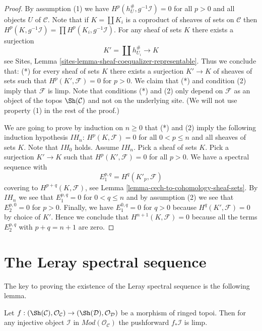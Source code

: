 \begin{proof}
By assumption (1) we have $H^p(h_U^\#, g^{-1}\mathcal{I}) = 0$ for all
$p > 0$ and all objects $U$ of $\mathcal{C}$. Note that if
$K = \coprod K_i$ is a coproduct of sheaves of sets on $\mathcal{C}$
then $H^p(K, g^{-1}\mathcal{I}) = \prod H^p(K_i, g^{-1}\mathcal{I})$.
For any sheaf of sets $K$ there exists a surjection
$$
K' = \coprod h_{U_i}^\# \longrightarrow K
$$
see Sites, Lemma \ref{sites-lemma-sheaf-coequalizer-representable}.
Thus we conclude that: (*) for every sheaf of sets $K$ there exists a
surjection $K' \to K$ of sheaves of sets such that $H^p(K', \mathcal{F}) = 0$
for $p > 0$. We claim that (*) and condition (2) imply that $\mathcal{F}$
is limp. Note that conditions (*) and (2) only depend on $\mathcal{F}$ as an
object of the topos $\Sh(\mathcal{C})$ and not on the underlying site.
(We will not use property (1) in the rest of the proof.)

\medskip\noindent
We are going to prove by induction on $n \geq 0$ that (*) and (2)
imply the following induction hypothesis $IH_n$:
$H^p(K, \mathcal{F}) = 0$ for all $0 < p \leq n$ and
all sheaves of sets $K$. Note that $IH_0$ holds. Assume $IH_n$. Pick
a sheaf of sets $K$. Pick a surjection $K' \to K$ such that
$H^p(K', \mathcal{F}) = 0$ for all $p > 0$. We have a
spectral sequence with
$$
E_1^{p, q} = H^q(K'_p, \mathcal{F})
$$
covering to $H^{p + q}(K, \mathcal{F})$, see
Lemma \ref{lemma-cech-to-cohomology-sheaf-sets}.
By $IH_n$ we see that $E_1^{p, q} = 0$ for $0 < q \leq n$ and by
assumption (2) we see that $E_2^{p, 0} = 0$ for $p > 0$. Finally, we have
$E_1^{0, q} = 0$ for $q > 0$ because $H^q(K', \mathcal{F}) = 0$ by
choice of $K'$. Hence we conclude that $H^{n + 1}(K, \mathcal{F}) = 0$
because all the terms $E_2^{p, q}$ with $p + q = n + 1$ are zero.
\end{proof}







\section{The Leray spectral sequence}
\label{section-leray}

\noindent
The key to proving the existence of the Leray spectral sequence is
the following lemma.

\begin{lemma}
\label{lemma-direct-image-injective-sheaf}
Let $f : (\Sh(\mathcal{C}), \mathcal{O}_\mathcal{C}) \to
(\Sh(\mathcal{D}), \mathcal{O}_\mathcal{D})$ be a morphism of ringed topoi.
Then for any injective object $\mathcal{I}$ in
$\textit{Mod}(\mathcal{O}_\mathcal{C})$
the pushforward $f_*\mathcal{I}$ is limp.
\end{lemma}

